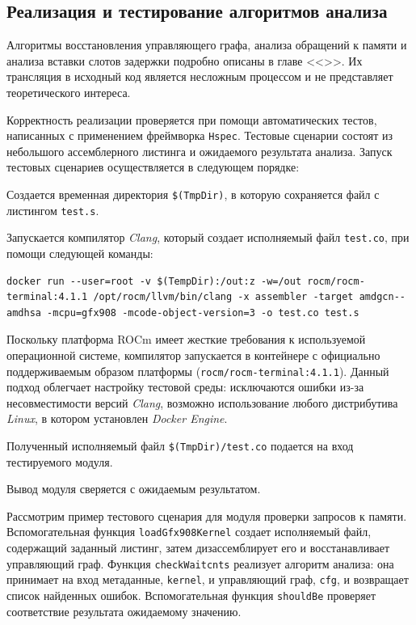 \documentclass[a4paper,14pt]{extarticle}
\begin{document}
{\subsection{Реализация и тестирование алгоритмов анализа}

Алгоритмы восстановления управляющего графа, анализа обращений к памяти и анализа
вставки слотов задержки подробно описаны в главе <<>>.
Их трансляция в исходный код является несложным процессом и не представляет
теоретического интереса.

Корректность реализации проверяется при помощи автоматических тестов,
написанных с применением фреймворка \verb|Hspec|. Тестовые сценарии состоят
из небольшого ассемблерного листинга и ожидаемого результата
анализа. Запуск тестовых сценариев осуществляется в следующем порядке:
\begin{ol}
\item Создается временная директория \verb|$(TmpDir)|, в которую сохраняется файл
с листингом \verb|test.s|.
\item Запускается компилятор \textit{Clang}, который создает исполняемый файл
\verb|test.co|, при помощи следующей команды:
\begin{verbatim}
docker run --user=root -v $(TempDir):/out:z -w=/out rocm/rocm-terminal:4.1.1 /opt/rocm/llvm/bin/clang -x assembler -target amdgcn--amdhsa -mcpu=gfx908 -mcode-object-version=3 -o test.co test.s
\end{verbatim}

Поскольку платформа ROCm имеет жесткие требования к используемой операционной системе,
компилятор запускается в контейнере с официально поддерживаемым образом платформы (\verb|rocm/rocm-terminal:4.1.1|).
Данный подход облегчает настройку тестовой среды: исключаются ошибки из-за несовместимости версий \textit{Clang},
возможно использование любого дистрибутива \textit{Linux}, в котором установлен \textit{Docker Engine}.

\item Полученный исполняемый файл \verb|$(TmpDir)/test.co| подается на вход тестируемого модуля.
\item Вывод модуля сверяется с ожидаемым результатом.
\end{ol}

Рассмотрим пример тестового сценария для модуля проверки запросов к памяти.
Вспомогательная функция \verb|loadGfx908Kernel| создает исполняемый файл,
содержащий заданный листинг, затем дизассемблирует его и
восстанавливает управляющий граф. Функция \verb|checkWaitcnts| реализует
алгоритм анализа: она принимает на вход метаданные, \verb|kernel|, и управляющий
граф, \verb|cfg|, и возвращает список найденных ошибок. Вспомогательная функция
\verb|shouldBe| проверяет соответствие результата ожидаемому значению.

}
\end{document}
